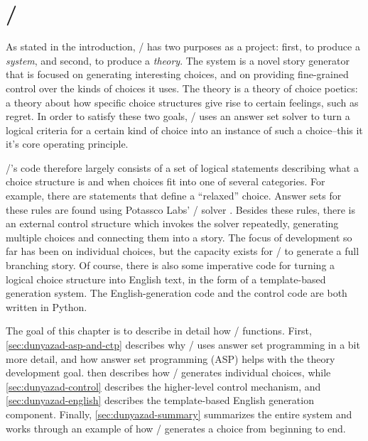 \chapter{\dunyazad/}

\label{ch:dunyazad}

As stated in the introduction, \dunyazad/ has two purposes as a project: first, to produce a \emph{system}, and second, to produce a \emph{theory}.
%
The system is a novel story generator that is focused on generating interesting choices, and on providing fine-grained control over the kinds of choices it uses.
%
The theory is a theory of choice poetics: a theory about how specific choice structures give rise to certain feelings, such as regret.
%
In order to satisfy these two goals, \dunyazad/ uses an answer set solver to turn a logical criteria for a certain kind of choice into an instance of such a choice--this it it's core operating principle.


\dunyazad/'s code therefore largely consists of a set of logical statements describing what a choice structure is and when choices fit into one of several categories.
%
For example, there are statements that define a ``relaxed'' choice.
%
Answer sets for these rules are found using Potassco Labs' \clingo/ solver \citep{Gebser2011}.
%
Besides these rules, there is an external control structure which invokes the solver repeatedly, generating multiple choices and connecting them into a story.
%
The focus of development so far has been on individual choices, but the capacity exists for \dunyazad/ to generate a full branching story.
%
Of course, there is also some imperative code for turning a logical choice structure into English text, in the form of a template-based generation system.
%
The English-generation code and the control code are both written in Python.


The goal of this chapter is to describe in detail how \dunyazad/ functions.
%
First, \cref{sec:dunyazad-asp-and-ctp} describes why \dunyazad/ uses answer set programming in a bit more detail, and how answer set programming (ASP) helps with the theory development goal.
%
 then describes how \dunyazad/ generates individual choices, while \cref{sec:dunyazad-control} describes the higher-level control mechanism, and \cref{sec:dunyazad-english} describes the template-based English generation component.
%
Finally, \cref{sec:dunyazad-summary} summarizes the entire system and works through an example of how \dunyazad/ generates a choice from beginning to end.

